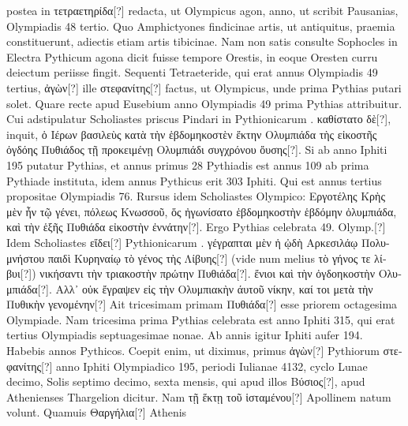 postea in \textgreek{τετραετηρίδα[?]} redacta,
 ut Olympicus agon, anno, ut scribit
Pausanias, Olympiadis 48 tertio.
%
Quo Amphictyones findicinae artis, ut
antiquitus, praemia constituerunt, adiectis etiam artis tibicinae.
Nam non satis consulte Sophocles in Electra Pythicum agona dicit fuisse
tempore Orestis, in eoque Oresten curru deiectum periisse fingit.
Sequenti
Tetraeteride, qui erat annus Olympiadis 49 tertius, \textgreek{ἀγὼν[?]}
 ille \textgreek{στεφανίτης[?]}
factus, ut Olympicus, unde prima Pythias putari solet.
Quare recte
apud Eusebium anno  Olympiadis 49 prima Pythias attribuitur.
Cui adstipulatur Scholiastes priscus Pindari in Pythionicarum
. \textgreek{καθίστατο δὲ[?]}, inquit,
 \textgreek{ὁ Ιέρων βασιλεὺς κατὰ τὴν ἑβδομηκοστὲν ἕκτην Ολυμπιάδα
τὴς εἰκοστῆς ὀγδόης Πυθιάδος τῇ προκειμένῃ Ολυμπιάδι συγχρόνου
ὄυσης[?]}.
Si ab anno Iphiti 195 putatur Pythias, et annus primus 28
Pythiadis est annus 109 ab prima Pythiade instituta, idem annus Pythicus
erit 303 Iphiti.
Qui est annus tertius propositae Olympiadis 76.
Rursus idem Scholiastes  Olympico:
 \textgreek{Εργοτέλης Κρὴς μὲν ἦν τῷ γένει,
πόλεως Κνωσσοῦ, ὅς ἠγωνίσατο ἑβδομηκοστὴν ἑβδόμην ὀλυμπιάδα, καὶ τὴν
ἑξῆς Πυθιάδα εἰκοστὴν ἐννάτην[?]}.
Ergo Pythias celebrata 49. Olymp.[?]
Idem
Scholiastes \textgreek{εἴδει[?]} Pythionicarum .
\textgreek{γέγραπται μὲν ἡ ᾠδὴ Αρκεσιλάῳ Πολυμνήστου
παιδὶ Κυρηναίῳ τὸ γένος τὴς Λίβυης[?]}
(vide num melius \textgreek{τὸ γήνος τε
λίβυι[?]})
\textgreek{νικήσαντι τὴν τριακοστὴν πρώτην Πυθιάδα[?]}.
\textgreek{ἔνιοι καὶ τὴν ὀγδοηκοστὴν
Ολυμπιάδα[?]}.
\textgreek{Αλλ᾽ οὐκ ἔγραψεν εἰς τὴν Ολυμπιακὴν άυτοῦ νίκην,
 καί τοι μετὰ
τὴν Πυθικὴν γενομένην[?]}
Ait tricesimam primam \textgreek{Πυθιάδα[?]} esse priorem
octagesima Olympiade.
Nam tricesima prima Pythias celebrata
est anno Iphiti 315, qui erat tertius Olympiadis septuagesimae nonae.
Ab annis igitur Iphiti aufer 194.
Habebis annos Pythicos.
Coepit
enim, ut diximus, primus \textgreek{ἀγὼν[?]} Pythiorum
 \textgreek{στεφανίτης[?]} anno Iphiti Olympiadico
195, periodi Iulianae 4132, cyclo Lunae decimo, Solis septimo
decimo, sexta mensis, qui apud illos \textgreek{Βύσιος[?]}, apud Athenienses
Thargelion dicitur.
Nam \textgreek{τῇ ἕκτῃ τοῦ ἱσταμένου[?]} Apollinem natum volunt.
Quamuis \textgreek{Θαργήλια[?]} Athenis
